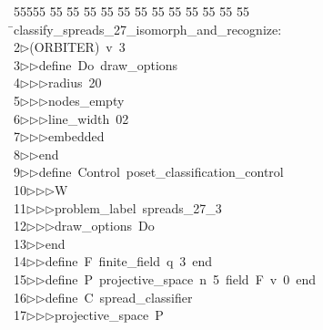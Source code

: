 %
%
\begin{tabbing}
55555 \= 55 \= 55 \= 55 \= 55 \= 55 \= 55 \= 55 \= 55 \= 55 \= 55 \= 55 \= 55 \= \>classify\_spreads\_27\_isomorph\_and\_recognize:\\[0pt]
2\>$\triangleright$\>(ORBITER)\ v\ 3\ \\[0pt]
3\>$\triangleright$\>$\triangleright$\>define\ Do\ draw\_options\ \\[0pt]
4\>$\triangleright$\>$\triangleright$\>$\triangleright$\>radius\ 20\ \\[0pt]
5\>$\triangleright$\>$\triangleright$\>$\triangleright$\>nodes\_empty\ \\[0pt]
6\>$\triangleright$\>$\triangleright$\>$\triangleright$\>line\_width\ 02\ \\[0pt]
7\>$\triangleright$\>$\triangleright$\>$\triangleright$\>embedded\ \\[0pt]
8\>$\triangleright$\>$\triangleright$\>end\ \\[0pt]
9\>$\triangleright$\>$\triangleright$\>define\ Control\ poset\_classification\_control\ \\[0pt]
10\>$\triangleright$\>$\triangleright$\>$\triangleright$\>W\ \\[0pt]
11\>$\triangleright$\>$\triangleright$\>$\triangleright$\>problem\_label\ spreads\_27\_3\ \\[0pt]
12\>$\triangleright$\>$\triangleright$\>$\triangleright$\>draw\_options\ Do\ \\[0pt]
13\>$\triangleright$\>$\triangleright$\>end\ \\[0pt]
14\>$\triangleright$\>$\triangleright$\>define\ F\ finite\_field\ q\ 3\ end\ \\[0pt]
15\>$\triangleright$\>$\triangleright$\>define\ P\ projective\_space\ n\ 5\ field\ F\ v\ 0\ end\ \\[0pt]
16\>$\triangleright$\>$\triangleright$\>define\ C\ spread\_classifier\ \\[0pt]
17\>$\triangleright$\>$\triangleright$\>$\triangleright$\>projective\_space\ P\ \\[0pt]

\end{tabbing}
